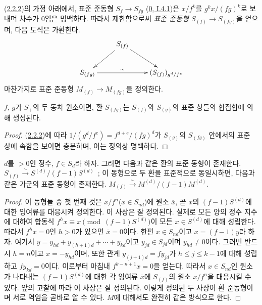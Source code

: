 \begin{env}[2.2.3]
\label{II.2.2.3-ko}
(\hyperref[II.2.2.2-ko]{2.2.2})의 가정 아래에서, 표준 준동형
$S_f\to S_{fg}$ (\hyperref[0.1.4.1-ko]{0, I.4.1})은 $x/f^k$를
$g^k x/(fg)^k$로 보내며 차수가 $0$임은 명백하다. 따라서
제한함으로써
\emph{표준 준동형 $S_{(f)}\to S_{(fg)}$}을 얻으며, 다음 도식은
가환한다.
\[
  \xymatrix{
    & S_{(f)}\ar[dl]\ar[dr]\\
    S_{(fg)}\ar[rr]^-{\sim} && (S_{(f)})_{g^d/f^e}
  }
\]
마찬가지로 표준 준동형 $M_{(f)}\to M_{(fg)}$을 정의한다.
\end{env}

\begin{lemma}[2.2.4]
\label{II.2.2.4-ko}
$f$, $g$가 $S_+$의 두 동차 원소이면, 환 $S_{(fg)}$는 $S_{(f)}$와
$S_{(g)}$의 표준 상들의 합집합에 의해 생성된다.
\end{lemma}

\begin{proof}
(\hyperref[II.2.2.2-ko]{2.2.2})에 따라
$1/(g^d/f^e)=f^{d+e}/(fg)^d$가 $S_{(g)}$의 $S_{(fg)}$ 안에서의 표준
상에 속함을 보이면 충분하며, 이는 정의상 명백하다.
\end{proof}

\begin{proposition}[2.2.5]
\label{II.2.2.5-ko}
$d$를 $>0$인 정수, $f\in S_d$라 하자. 그러면 다음과 같은 환의
표준 동형이 존재한다.
$S_{(f)}\xrightarrow{\sim}S^{(d)}/(f-1)S^{(d)}$~; 이 동형으로 두 환을
표준적으로 동일시하면, 다음과 같은 가군의 표준 동형이 존재한다.
$M_{(f)}\xrightarrow{\sim}M^{(d)}/(f-1)M^{(d)}$.
\end{proposition}

\begin{proof}
이 동형들 중 첫 번째 것은 $x/f^n$($x\in S_{nd}$)에 원소
$\overline{x}$, 곧 $x$의 $(f-1)S^{(d)}$에 대한 잉여류를 대응시켜 정의한다.
이 사상은 잘 정의된다. 실제로 모든 양의 정수 지수에 대하여 합동식
$f^h x\equiv x\pmod{(f-1)S^{(d)}}$이 모든 $x\in S^{(d)}$에 대해
성립한다. 따라서 $f^h x=0$인 $h>0$가 있으면
$\overline{x}=0$이다. 한편 $x\in S_{nd}$이고 $x=(f-1)y$라 하자. 여기서
$y=y_{hd}+y_{(h+1)d}+\cdots+y_{kd}$이고 $y_{jd}\in S_{jd}$이며
$y_{hd}\neq 0$이다. 그러면 반드시 $h=n$이고 $x=-y_{hd}$이며, 또한
관계 $y_{(j+1)d}=fy_{jd}$가 $h\leq j\leq k-1$에 대해 성립하고
$fy_{kd}=0$이다.
이로부터 마침내 $f^{k-n+1}x=0$을 얻는다. 따라서 $x\in S_{nd}$인 원소가
나타내는 $(f-1)S^{(d)}$에 대한 각 잉여류 $\overline{x}$에 $S_{(f)}$의 원소
$x/f^n$을 대응시킬 수 있다.
앞의 고찰에 따라 이 사상은 잘 정의된다. 이렇게 정의된 두 사상이
환 준동형이며 서로 역임을 곧바로 알 수 있다. $M$에 대해서도 완전히
같은 방식으로 한다.
\end{proof}

